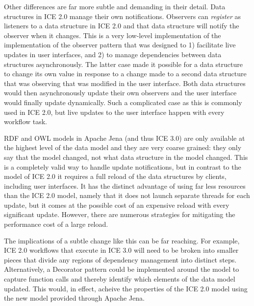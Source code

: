 Other differences are far more subtle and demanding in their detail. Data structures in ICE 2.0 manage their own notifications. Observers can \textit{register} as listeners to a data structure in ICE 2.0 and that data structure will notify the observer when it changes. This is a very low-level implementation of the implementation of the observer pattern that was designed to 1) facilitate live updates in user interfaces, and 2) to manage dependencies between data structures asynchronously. The latter case made it possible for a data structure to change its own value in response to a change made to a second data structure that was observing that was modified in the user interface. Both data structures would then asynchronously update their own observers and the user interface would finally update dynamically. Such a complicated case as this is commonly used in ICE 2.0, but live updates to the user interface happen with every workflow task.

RDF and OWL models in Apache Jena (and thus ICE 3.0) are only available at the highest level of the data model and they are very coarse grained: they only say that the model changed, not what data structure in the model changed. This is a completely valid way to handle update notifications, but in contrast to the model of ICE 2.0 it requires a full reload of the data structures by clients, including user interfaces. It has the distinct advantage of using far less resources than the ICE 2.0 model, namely that it does not launch separate threads for each update, but it comes at the possible cost of an expensive reload with every significant update. However, there are numerous strategies for mitigating the performance cost of a large reload.

The implications of a subtle change like this can be far reaching. For example, ICE 2.0 workflows that execute in ICE 3.0 will need to be broken into smaller pieces that divide any regions of dependency management into distinct steps. Alternatively, a Decorator pattern could be implemented around the model to capture function calls and thereby identify which elements of the data model updated. This would, in effect, acheive the properties of the ICE 2.0 model using the new model provided through Apache Jena.

